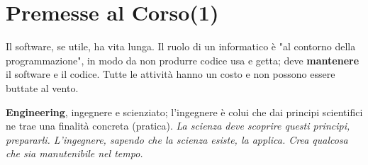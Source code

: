 





\section{Premesse al Corso(1)}

Il software, se utile, ha vita lunga.
Il ruolo di un informatico è "al contorno della programmazione", in modo da non produrre codice usa e getta; deve \textbf{mantenere} il software e il codice. Tutte le attività hanno un costo e non possono essere buttate al vento.

\textbf{Engineering}, ingegnere e scienziato; l'ingegnere è colui che dai principi scientifici ne trae una finalità concreta (pratica).\textit{ La scienza deve scoprire questi principi, prepararli. L'ingegnere, sapendo che la scienza esiste, la applica. Crea qualcosa che sia manutenibile nel tempo.}

